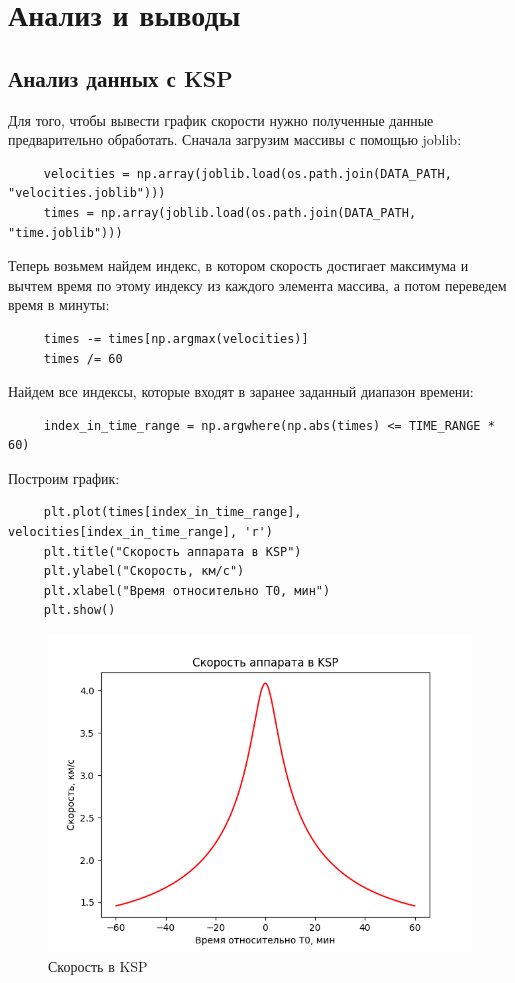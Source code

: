 \documentclass{article}
\begin{document}
     \section{Анализ и выводы}
     \subsection{Анализ данных с KSP}
     Для того, чтобы вывести график скорости нужно полученные данные предварительно обработать. Сначала загрузим массивы с помощью joblib:
     \begin{verbatim}
     velocities = np.array(joblib.load(os.path.join(DATA_PATH, "velocities.joblib")))
     times = np.array(joblib.load(os.path.join(DATA_PATH, "time.joblib")))
     \end{verbatim}
     Теперь возьмем найдем индекс, в котором скорость достигает максимума и вычтем время по этому индексу из каждого элемента массива, а потом переведем время в минуты:
     \begin{verbatim}
     times -= times[np.argmax(velocities)]
     times /= 60
     \end{verbatim}
     Найдем все индексы, которые входят в заранее заданный диапазон времени:
     \begin{verbatim}
     index_in_time_range = np.argwhere(np.abs(times) <= TIME_RANGE * 60)
     \end{verbatim}
     Построим график:
     \begin{verbatim}
     plt.plot(times[index_in_time_range], velocities[index_in_time_range], 'r')
     plt.title("Скорость аппарата в KSP")
     plt.ylabel("Скорость, км/с")
     plt.xlabel("Время относительно T0, мин")
     plt.show()
     \end{verbatim}
     \begin{figure}[H]
         \centering
         \includegraphics[width=0.75\linewidth]{images/ksp_speed.png}
         \caption{Скорость в KSP}
     \end{figure}
\end{document}
